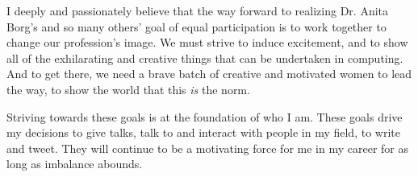 \documentclass[acmtocl]{acmtrans2m}
\begin{document}
I deeply and passionately believe that the way forward to realizing Dr. Anita
Borg's and so many others' goal of equal participation is to work together to
change our profession's image. We must strive to induce excitement, and to
show all of the exhilarating and creative things that can be undertaken in
computing. And to get there, we need a brave batch of creative and motivated
women to lead the way, to show the world that this \textit{is} the norm.

Striving towards these goals is at the foundation of who I am. These goals
drive my decisions to give talks, talk to and interact with people in my
field, to write and tweet. They will continue to be a motivating force for me
in my career for as long as imbalance abounds.

% 
% 
% 

\printbibliography

\end{document}
